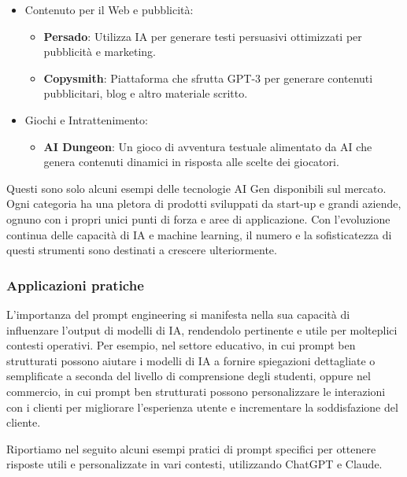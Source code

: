 \begin{itemize}
\begin{itemize}
            \end{itemize}
            \item Contenuto per il Web e pubblicità:
            \begin{itemize}
                \item \textbf{Persado}: Utilizza IA per generare testi persuasivi ottimizzati per pubblicità e marketing.
                \item \textbf{Copysmith}: Piattaforma che sfrutta GPT-3 per generare contenuti pubblicitari, blog e altro materiale scritto.
            \end{itemize}
            \item Giochi e Intrattenimento:
            \begin{itemize}
                \item \textbf{AI Dungeon}: Un gioco di avventura testuale alimentato da AI che genera contenuti dinamici in risposta alle scelte dei giocatori.
            \end{itemize}
        \end{itemize}

        Questi sono solo alcuni esempi delle tecnologie AI Gen disponibili sul mercato. Ogni categoria ha una pletora di prodotti sviluppati da start-up e grandi aziende, ognuno con i propri unici punti di forza e aree di applicazione. Con l'evoluzione continua delle capacità di IA e machine learning, il numero e la sofisticatezza di questi strumenti sono destinati a crescere ulteriormente. 
    
        \subsubsection{Applicazioni pratiche}
            L'importanza del prompt engineering si manifesta nella sua capacità di influenzare l'output di modelli di IA, rendendolo pertinente e utile per molteplici contesti operativi. Per esempio, nel settore educativo, in cui prompt ben strutturati possono aiutare i modelli di IA a fornire spiegazioni dettagliate o semplificate a seconda del livello di comprensione degli studenti, oppure nel commercio, in cui prompt ben strutturati possono personalizzare le interazioni con i clienti per migliorare l'esperienza utente e incrementare la soddisfazione del cliente.  

            Riportiamo nel seguito alcuni esempi pratici di prompt specifici per ottenere risposte utili e personalizzate in vari contesti, utilizzando ChatGPT e Claude. 


